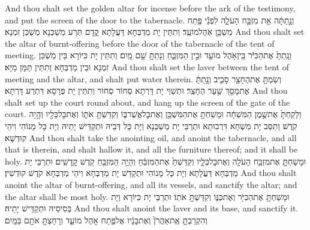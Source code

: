 {And thou shalt set the golden altar for incense before the ark of the testimony, and put the screen of the door to the tabernacle.}{}
{וְנָ֣תַתָּ֔ה אֵ֖ת מִזְבַּ֣ח הָעֹלָ֑ה לִפְנֵ֕י פֶּ֖תַח מִשְׁכַּ֥ן אֹֽהֶל\maqqaf מוֹעֵֽד׃}
{וְתִתֵּין יָת מַדְבְּחָא דַּעֲלָתָא קֳדָם תְּרַע מַשְׁכְּנָא מַשְׁכַּן זִמְנָא׃}
{And thou shalt set the altar of burnt-offering before the door of the tabernacle of the tent of meeting.}{}
{וְנָֽתַתָּ֙ אֶת\maqqaf הַכִּיֹּ֔ר בֵּֽין\maqqaf אֹ֥הֶל מוֹעֵ֖ד וּבֵ֣ין הַמִּזְבֵּ֑חַ וְנָתַתָּ֥ שָׁ֖ם מָֽיִם׃}
{וְתִתֵּין יָת כִּיּוֹרָא בֵּין מַשְׁכַּן זִמְנָא וּבֵין מַדְבְּחָא וְתִתֵּין תַּמָּן מַיָּא׃}
{And thou shalt set the laver between the tent of meeting and the altar, and shalt put water therein.}{}
{וְשַׂמְתָּ֥ אֶת\maqqaf הֶחָצֵ֖ר סָבִ֑יב וְנָ֣תַתָּ֔ אֶת\maqqaf מָסַ֖ךְ שַׁ֥עַר הֶחָצֵֽר׃}
{וּתְשַׁוֵּי יָת דָּרְתָא סְחוֹר סְחוֹר וְתִתֵּין יָת פְּרָסָא דִּתְרַע דָּרְתָא׃}
{And thou shalt set up the court round about, and hang up the screen of the gate of the court.}{}
{וְלָקַחְתָּ֙ אֶת\maqqaf שֶׁ֣מֶן הַמִּשְׁחָ֔ה וּמָשַׁחְתָּ֥ אֶת\maqqaf הַמִּשְׁכָּ֖ן וְאֶת\maqqaf כׇּל\maqqaf אֲשֶׁר\maqqaf בּ֑וֹ וְקִדַּשְׁתָּ֥ אֹת֛וֹ וְאֶת\maqqaf כׇּל\maqqaf כֵּלָ֖יו וְהָ֥יָה קֹֽדֶשׁ׃}
{וְתִסַּב יָת מִשְׁחָא דִּרְבוּתָא וּתְרַבֵּי יָת מַשְׁכְּנָא וְיָת כָּל דְּבֵיהּ וּתְקַדֵּישׁ יָתֵיהּ וְיָת כָּל מָנוֹהִי וִיהֵי קוּדְשָׁא׃}
{And thou shalt take the anointing oil, and anoint the tabernacle, and all that is therein, and shalt hallow it, and all the furniture thereof; and it shall be holy.}{}
{וּמָשַׁחְתָּ֛ אֶת\maqqaf מִזְבַּ֥ח הָעֹלָ֖ה וְאֶת\maqqaf כׇּל\maqqaf כֵּלָ֑יו וְקִדַּשְׁתָּ֙ אֶת\maqqaf הַמִּזְבֵּ֔חַ וְהָיָ֥ה הַמִּזְבֵּ֖חַ קֹ֥דֶשׁ קׇֽדָשִֽׁים׃}
{וּתְרַבֵּי יָת מַדְבְּחָא דַּעֲלָתָא וְיָת כָּל מָנוֹהִי וּתְקַדֵּשׁ יָת מַדְבְּחָא וִיהֵי מַדְבְּחָא קֹדֶשׁ קוּדְשִׁין׃}
{And thou shalt anoint the altar of burnt-offering, and all its vessels, and sanctify the altar; and the altar shall be most holy.}{}
{וּמָשַׁחְתָּ֥ אֶת\maqqaf הַכִּיֹּ֖ר וְאֶת\maqqaf כַּנּ֑וֹ וְקִדַּשְׁתָּ֖ אֹתֽוֹ׃}
{וּתְרַבֵּי יָת כִּיּוֹרָא וְיָת בְּסִיסֵיהּ וּתְקַדֵּישׁ יָתֵיהּ׃}
{And thou shalt anoint the laver and its base, and sanctify it.}{}
{וְהִקְרַבְתָּ֤ אֶֽת\maqqaf אַהֲרֹן֙ וְאֶת\maqqaf בָּנָ֔יו אֶל\maqqaf פֶּ֖תַח אֹ֣הֶל מוֹעֵ֑ד וְרָחַצְתָּ֥ אֹתָ֖ם בַּמָּֽיִם׃}
